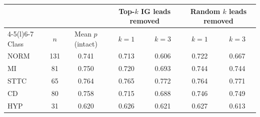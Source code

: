 \begin{tabular}{@{}lcccccc@{}}
\toprule
 & & & \multicolumn{2}{c}{Top-$k$ IG leads removed} & \multicolumn{2}{c}{Random $k$ leads removed} \\
\cmidrule(lr){4-5}\cmidrule(l){6-7}
Class & $n$ & Mean $p$ (intact) & $k=1$ & $k=3$ & $k=1$ & $k=3$ \\
\midrule
NORM & 131 & 0.741 & 0.713 & 0.606 & 0.722 & 0.667 \\
MI & 81 & 0.750 & 0.720 & 0.693 & 0.744 & 0.744 \\
STTC & 65 & 0.764 & 0.765 & 0.772 & 0.764 & 0.771 \\
CD & 80 & 0.758 & 0.715 & 0.688 & 0.746 & 0.749 \\
HYP & 31 & 0.620 & 0.626 & 0.621 & 0.627 & 0.613 \\
\bottomrule
\end{tabular}
